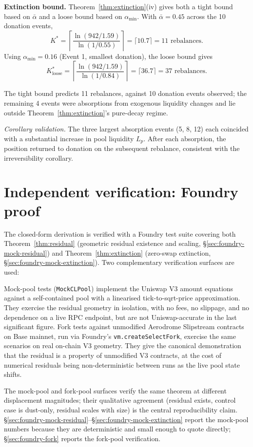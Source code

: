\documentclass[11pt,a4paper]{article}
\begin{document}
\textbf{Extinction bound.} Theorem~\ref{thm:extinction}(iv) gives both a tight bound based on $\bar\alpha$ and a loose bound based on $\alpha_{\min}$. With $\bar\alpha = 0.45$ across the 10 donation events,
\[
K^* = \left\lceil \frac{\ln(942/1.59)}{\ln(1/0.55)} \right\rceil = \lceil 10.7 \rceil = 11 \text{ rebalances}.
\]
Using $\alpha_{\min} = 0.16$ (Event 1, smallest donation), the loose bound gives
\[
K^*_{\text{loose}} = \left\lceil \frac{\ln(942/1.59)}{\ln(1/0.84)} \right\rceil = \lceil 36.7 \rceil = 37 \text{ rebalances}.
\]

The tight bound predicts 11 rebalances, against 10 donation events observed; the remaining 4 events were absorptions from exogenous liquidity changes and lie outside Theorem~\ref{thm:extinction}'s pure-decay regime.

\emph{Corollary validation.} The three largest absorption events (5, 8, 12) each coincided with a substantial increase in pool liquidity $L_p$. After each absorption, the position returned to donation on the subsequent rebalance, consistent with the irreversibility corollary.

\section{Independent verification: Foundry proof}\label{sec:foundry}

The closed-form derivation is verified with a Foundry test suite covering both Theorem~\ref{thm:residual} (geometric residual existence and scaling, \S\ref{sec:foundry-mock-residual}) and Theorem~\ref{thm:extinction} (zero-swap extinction, \S\ref{sec:foundry-mock-extinction}). Two complementary verification surfaces are used:

Mock-pool tests (\texttt{MockCLPool}) implement the Uniswap V3 amount equations against a self-contained pool with a linearised tick-to-sqrt-price approximation. They exercise the residual geometry in isolation, with no fees, no slippage, and no dependence on a live RPC endpoint, but are not Uniswap-accurate in the last significant figure. Fork tests against unmodified Aerodrome Slipstream contracts on Base mainnet, run via Foundry's \texttt{vm.createSelectFork}, exercise the same scenarios on real on-chain V3 geometry. They give the canonical demonstration that the residual is a property of unmodified V3 contracts, at the cost of numerical residuals being non-deterministic between runs as the live pool state shifts.

The mock-pool and fork-pool surfaces verify the same theorem at different displacement magnitudes; their qualitative agreement (residual exists, control case is dust-only, residual scales with size) is the central reproducibility claim. \S\ref{sec:foundry-mock-residual}--\S\ref{sec:foundry-mock-extinction} report the mock-pool numbers because they are deterministic and small enough to quote directly; \S\ref{sec:foundry-fork} reports the fork-pool verification.
\end{document}
